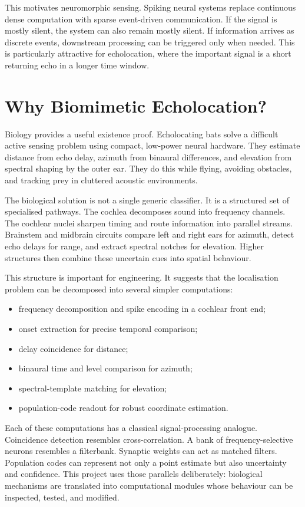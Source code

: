 This motivates neuromorphic sensing. Spiking neural systems replace continuous dense computation with sparse event-driven communication. If the signal is mostly silent, the system can also remain mostly silent. If information arrives as discrete events, downstream processing can be triggered only when needed. This is particularly attractive for echolocation, where the important signal is a short returning echo in a longer time window.

\section{Why Biomimetic Echolocation?}

Biology provides a useful existence proof. Echolocating bats solve a difficult active sensing problem using compact, low-power neural hardware. They estimate distance from echo delay, azimuth from binaural differences, and elevation from spectral shaping by the outer ear. They do this while flying, avoiding obstacles, and tracking prey in cluttered acoustic environments.

The biological solution is not a single generic classifier. It is a structured set of specialised pathways. The cochlea decomposes sound into frequency channels. The cochlear nuclei sharpen timing and route information into parallel streams. Brainstem and midbrain circuits compare left and right ears for azimuth, detect echo delays for range, and extract spectral notches for elevation. Higher structures then combine these uncertain cues into spatial behaviour.

This structure is important for engineering. It suggests that the localisation problem can be decomposed into several simpler computations:
\begin{itemize}
    \item frequency decomposition and spike encoding in a cochlear front end;
    \item onset extraction for precise temporal comparison;
    \item delay coincidence for distance;
    \item binaural time and level comparison for azimuth;
    \item spectral-template matching for elevation;
    \item population-code readout for robust coordinate estimation.
\end{itemize}

Each of these computations has a classical signal-processing analogue. Coincidence detection resembles cross-correlation. A bank of frequency-selective neurons resembles a filterbank. Synaptic weights can act as matched filters. Population codes can represent not only a point estimate but also uncertainty and confidence. This project uses those parallels deliberately: biological mechanisms are translated into computational modules whose behaviour can be inspected, tested, and modified.

